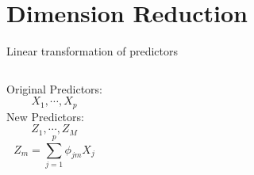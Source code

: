 \documentclass[aspectratio=169,usenames,dvipsnames]{beamer}
\newcommand{\InstructorList}[1]{
\begin{itemize}
	\color{orange}
	#1
\end{itemize}
}
\renewcommand{\InstructorList}[1]{}
\begin{document}
\section{Dimension Reduction }


\begin{frame}[t]{Linear transformation of predictors }

\begin{columns}
\centering
Original Predictors:
\begin{equation*}
	X_1,\cdots,X_p
\end{equation*}
\centering
New Predictors:
\begin{equation*}
	Z_1,\cdots,Z_M
\end{equation*}
\begin{equation*}
	Z_m = \sum_{j=1}^p \phi_{jm}X_j
\end{equation*}

\end{columns}
\InstructorList{
\item The goal is for $M \ll p$
\item Need to figure out good $\phi$ to do this
}
\end{frame}
\end{document}
